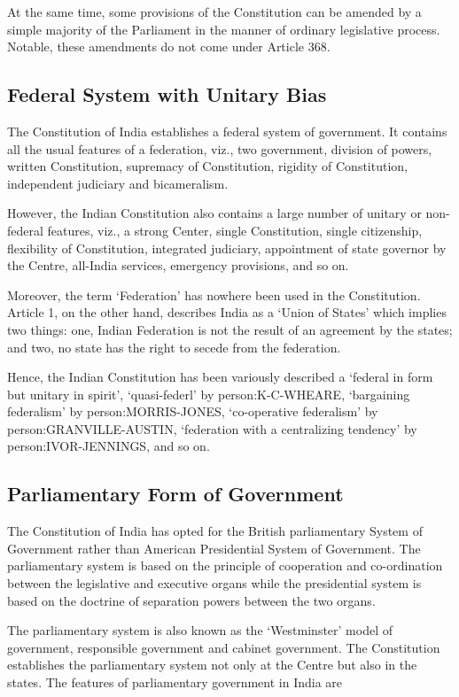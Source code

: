 At the same time, some provisions of the Constitution can be amended by a simple majority of the Parliament in the manner of ordinary legislative process. Notable, these amendments do not come under Article 368.

\subsection{Federal System with Unitary Bias}

The Constitution of India establishes a federal system of government. It contains all the usual features of a federation, viz., two government, division of powers, written Constitution, supremacy of Constitution, rigidity of Constitution, independent judiciary and bicameralism.

However, the Indian Constitution also contains a large number of unitary or non-federal features, viz., a strong Center, single Constitution, single citizenship, flexibility of Constitution, integrated judiciary, appointment of state governor by the Centre, all-India services, emergency provisions, and so on.

Moreover, the term `Federation' has nowhere been used in the Constitution. Article 1, on the other hand, describes India as a `Union of States' which implies two things: one, Indian Federation is not the result of an agreement by the states; and two, no state has the right to secede from the federation.

Hence, the Indian Constitution has been variously described a `federal in form but unitary in spirit', `quasi-federl' by \gls{person:K-C-WHEARE}, `bargaining federalism' by \gls{person:MORRIS-JONES}, `co-operative federalism' by \gls{person:GRANVILLE-AUSTIN}, `federation with a centralizing tendency' by \gls{person:IVOR-JENNINGS}, and so on.

\subsection{Parliamentary Form of Government}

The Constitution of India has opted for the British parliamentary System of Government rather than American Presidential System of Government. The parliamentary system is based on the principle of cooperation and co-ordination between the legislative and executive organs while the presidential system is based on the doctrine of separation powers between the two organs.

The parliamentary system is also known as the `Westminster' model of government, responsible government and cabinet government. The Constitution establishes the parliamentary system not only at the Centre but also in the states. The features of parliamentary government in India are

